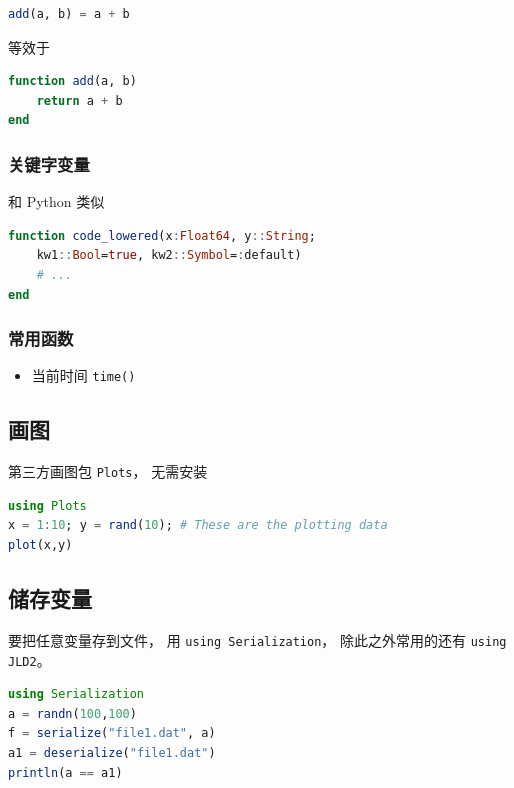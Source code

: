 \begin{lstlisting}[language=julia]
add(a, b) = a + b
\end{lstlisting}
等效于
\begin{lstlisting}[language=julia]
function add(a, b)
    return a + b
end
\end{lstlisting}

\subsubsection{关键字变量}
和 Python 类似
\begin{lstlisting}[language=julia]
function code_lowered(x:Float64, y::String;
    kw1::Bool=true, kw2::Symbol=:default)
    # ...
end
\end{lstlisting}

\subsubsection{常用函数}
\begin{itemize}
\item 当前时间 \verb`time()`
\end{itemize}



\subsection{画图}
第三方画图包 \verb`Plots`， 无需安装
\begin{lstlisting}[language=Julia]
using Plots
x = 1:10; y = rand(10); # These are the plotting data
plot(x,y)
\end{lstlisting}


\subsection{储存变量}
要把任意变量存到文件， 用 \verb`using Serialization`， 除此之外常用的还有 \verb`using JLD2`。
\begin{lstlisting}[language=julia]
using Serialization
a = randn(100,100)
f = serialize("file1.dat", a)
a1 = deserialize("file1.dat")
println(a == a1)
\end{lstlisting}

